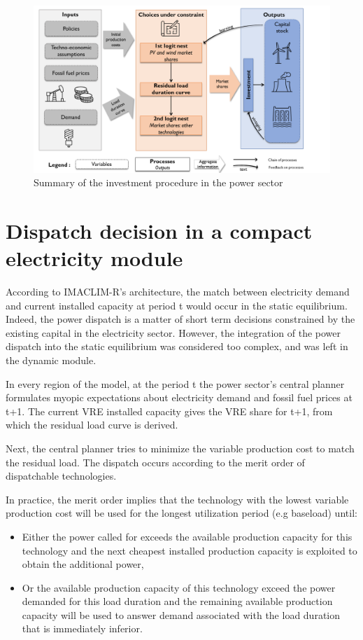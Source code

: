 \begin{figure}[H]
\includegraphics[scale=0.45]{figures&tables/Summary_nexus.png}
\centering
\caption{Summary of the investment procedure in the power sector}
\label{fig:suminv}
\end{figure}


\section{Dispatch decision in a compact electricity module}


According to IMACLIM-R's architecture, the match between electricity demand and current installed capacity at period t would occur in the static equilibrium. Indeed, the power dispatch is a matter of short term decisions constrained by the existing capital in the electricity sector. However, the integration of the power dispatch into the static equilibrium was considered too complex, and was left in the dynamic module.

In every region of the model, at the period t the power sector's central planner formulates myopic expectations about electricity demand and fossil fuel prices at t+1. The current VRE installed capacity gives the VRE share for t+1, from which the residual load curve is derived.


Next, the central planner tries to minimize the variable production cost  to match the residual load. The dispatch occurs according to the merit order of dispatchable technologies.


In practice, the merit order implies that the technology with the lowest variable production cost will be used for the longest utilization period (e.g baseload) until:

\begin{itemize}
    \item Either the power called for exceeds the available production capacity for this technology and the next cheapest installed production capacity is exploited to obtain the additional power,
    \item Or the available production capacity of this technology exceed the power demanded for this load duration and the remaining available production capacity will be used to answer demand associated with the load duration that is immediately inferior.
\end{itemize}

